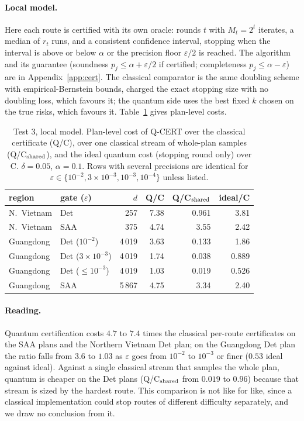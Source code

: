 \documentclass[pdflatex,sn-mathphys-num]{sn-jnl}
\theoremstyle{thmstyleone}
\theoremstyle{thmstyletwo}
\begin{document}
\paragraph{Local model.} Here each route is certified with its own oracle: rounds $t$ with $M_t=2^t$ iterates, a median of $r_t$ runs, and a consistent confidence interval, stopping when the interval is above or below $\alpha$ or the precision floor $\varepsilon/2$ is reached. The algorithm and its guarantee (soundness $p_j\le\alpha+\varepsilon/2$ if certified; completeness $p_j\le\alpha-\varepsilon$) are in Appendix~\ref{app:cert}. The classical comparator is the same doubling scheme with empirical-Bernstein bounds, charged the exact stopping size with no doubling loss, which favours it; the quantum side uses the best fixed $k$ chosen on the true risks, which favours it. Table~\ref{tab:local} gives plan-level costs.

\begin{table}[t]
\caption{Test 3, local model. Plan-level cost of Q-CERT over the classical certificate (Q/C), over one classical stream of whole-plan samples (Q/C$_{\rm shared}$), and the ideal quantum cost (stopping round only) over C. $\delta=0.05$, $\alpha=0.1$. Rows with several precisions are identical for $\varepsilon\in\{10^{-2},3\times10^{-3},10^{-3},10^{-4}\}$ unless listed.}\label{tab:local}
\begin{tabular}{@{}llrrrr@{}}
\toprule
region & gate ($\varepsilon$) & $d$ & Q/C & Q/C$_{\rm shared}$ & ideal/C \\
\midrule
N.\ Vietnam & Det & 257 & 7.38 & 0.961 & 3.81 \\
N.\ Vietnam & SAA & 375 & 4.74 & 3.55 & 2.42 \\
Guangdong & Det ($10^{-2}$) & 4\,019 & 3.63 & 0.133 & 1.86 \\
Guangdong & Det ($3\times10^{-3}$) & 4\,019 & 1.74 & 0.038 & 0.889 \\
Guangdong & Det ($\le10^{-3}$) & 4\,019 & 1.03 & 0.019 & 0.526 \\
Guangdong & SAA & 5\,867 & 4.75 & 3.34 & 2.40 \\
\bottomrule
\end{tabular}
\end{table}

\paragraph{Reading.} Quantum certification costs $4.7$ to $7.4$ times the classical per-route certificates on the SAA plans and the Northern Vietnam Det plan; on the Guangdong Det plan the ratio falls from $3.6$ to $1.03$ as $\varepsilon$ goes from $10^{-2}$ to $10^{-3}$ or finer ($0.53$ ideal against ideal). Against a single classical stream that samples the whole plan, quantum is cheaper on the Det plans (Q/C$_{\rm shared}$ from $0.019$ to $0.96$) because that stream is sized by the hardest route. This comparison is not like for like, since a classical implementation could stop routes of different difficulty separately, and we draw no conclusion from it.
\end{document}
